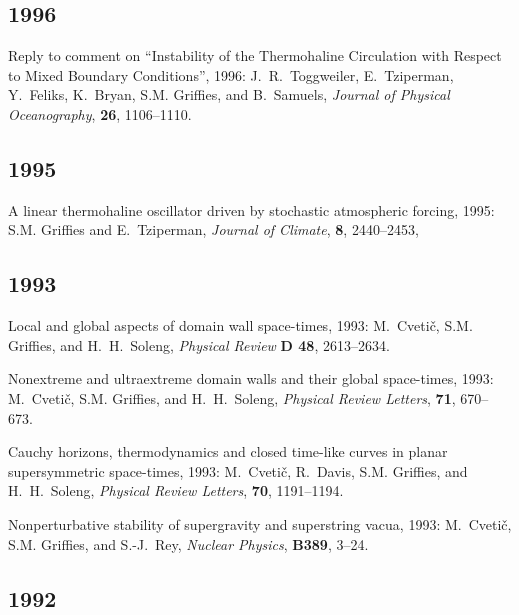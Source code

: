 \begin{etaremune}
\subsection*{\sc \color{Maroon} 1996}
 
\item Reply to comment on ``Instability of the Thermohaline Circulation with Respect to Mixed Boundary Conditions'', 1996: J.\ R.\ Toggweiler, E.\ Tziperman, Y.\ Feliks, K.\ Bryan, S.M. Grif\/f\/ies, and B.\ Samuels, {\em Journal of Physical
Oceanography}, {\bf 26}, 1106--1110.

\subsection*{\sc \color{Maroon} 1995}
  
\item A linear thermohaline oscillator driven by stochastic atmospheric forcing, 1995: S.M. Grif\/f\/ies and E.\ Tziperman, {\em Journal of Climate}, {\bf 8}, 2440--2453, 

\subsection*{\sc \color{Maroon} 1993}

\item Local and global aspects of domain wall space-times, 1993: M.\ Cveti\v c, S.M. Grif\/f\/ies, and H.\ H.\ Soleng, {\em Physical Review} {\bf D 48}, 2613--2634.

\item Nonextreme and ultraextreme domain walls and their global space-times, 1993: M.\ Cveti\v c, S.M. Grif\/f\/ies, and H.\ H.\ Soleng, {\em Physical Review Letters}, {\bf 71}, 670--673.

\item Cauchy horizons, thermodynamics and closed time-like curves in planar supersymmetric space-times, 1993: M.\ Cveti\v c, R.\ Davis, S.M. Grif\/f\/ies, and H.\ H.\ Soleng, {\em Physical Review Letters}, {\bf 70}, 1191--1194.


\item Nonperturbative stability of supergravity and superstring vacua, 1993: M.\ Cveti\v c, S.M. Grif\/f\/ies, and S.-J.\ Rey, {\em Nuclear Physics}, {\bf B389}, 3--24.

\subsection*{\sc \color{Maroon} 1992}
 

\end{etaremune}
